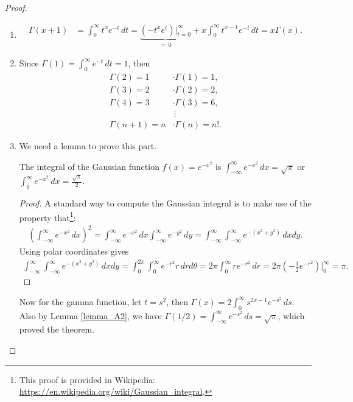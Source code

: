 \begin{proof}
~\begin{enumerate}[label=(\alph*)]
    \item \begin{align*}
        \Gamma(x+1) & = \int^\infty_{0} t^{x} e^{-t}\, dt = \underbrace{\left(-t^xe^t\right)\Big|^\infty_{t=0}}_{=\,0} + x \int^\infty_{0} t^{x-1} e^{-t}\, dt = x \Gamma(x).
    \end{align*}
    
    \item Since $\displaystyle \Gamma(1) = \int^\infty_0 e^{-t}\, dt = 1$, then
    \begin{align*}
        \Gamma(2) = 1 & \cdot \Gamma(1) = 1, \\
        \Gamma(3) = 2 & \cdot \Gamma(2) = 2, \\
        \Gamma(4) = 3 & \cdot \Gamma(3) = 6,\\
        & \, \vdots \\
        \Gamma(n+1) = n & \cdot \Gamma(n) = n!.
    \end{align*}
    
    \item We need a lemma to prove this part.
    \begin{lemma}\label{lemma_A2}
    The integral of the Gaussian function $f(x) = e^{-x^2}$ is
    $\displaystyle \int^\infty_{-\infty} e^{-x^2}\, dx = \sqrt{\pi}$ or $\displaystyle \int^\infty_0 e^{-x^2}\, dx = \frac{\sqrt{\pi}}{2}$.
    \end{lemma}
    \begin{proof}
    A standard way to compute the Gaussian integral is to make use of the property that\footnote{This proof is provided in Wikipedia: \url{https://en.wikipedia.org/wiki/Gaussian_integral}.}:
    \begin{align*}
        \left(\int^\infty_{-\infty} e^{-x^2}\, dx\right)^2 = \int^\infty_{-\infty} e^{-x^2}\, dx \int^\infty_{-\infty} e^{-y^2}\, dy = \int^\infty_{-\infty} \int^\infty_{-\infty} e^{-(x^2+y^2)}\, dxdy.
    \end{align*}
    Using polar coordinates gives
    \begin{align*}
        \int^\infty_{-\infty} \int^\infty_{-\infty} e^{-(x^2+y^2)}\, dxdy = \int^{2\pi}_0 \int^\infty_0 e^{-r^2} r \, dr d\theta = 2\pi \int^\infty_0 r e^{-r^2} \, dr = 2\pi \left(-\frac{1}{2} e^{-r^2}\right) \Bigg|^\infty_0 = \pi.
    \end{align*}
    \end{proof}
    
    Now for the gamma function, let $t = s^2$, then $\displaystyle \Gamma(x) = 2 \int^\infty_0 s^{2x-1} e^{-s^2}\, ds$. Also by Lemma \ref{lemma_A2}, we have $\displaystyle \Gamma(1/2) = \int^\infty_{-\infty} e^{-s^2}\, ds = \sqrt{\pi}$, which proved the theorem.
\end{enumerate}
\end{proof}

